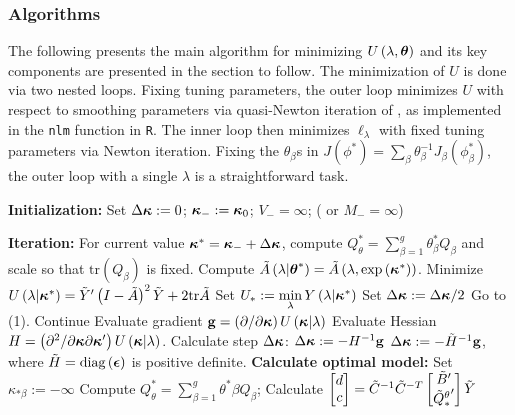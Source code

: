 \subsubsection{Algorithms}

The following presents the main algorithm for minimizing $U\left(\lambda, \mbox{\boldmath $\theta$} \right)$ and its key components are presented in the section to follow. The minimization of $U$ is done via two nested loops. Fixing tuning parameters, the outer loop minimizes $U$ with respect to smoothing parameters via quasi-Newton iteration of \cite{dennis1996numerical}, as implemented in the \texttt{nlm} function in \texttt{R}. The inner loop then minimizes $\ell_\lambda$ with fixed tuning parameters via Newton iteration. Fixing the $\theta_\beta$s in $J \left(\phi^*\right) = \sum_\beta \theta^{-1}_\beta J_\beta \left(\phi_\beta^*\right)$, the outer loop with a single $\lambda$ is a straightforward task. 

\begin{algorithm}[H]
\caption{ }
\begin{algorithmic}
\STATE \textbf{Initialization:} 
	\STATE Set $\Delta \mbox{\boldmath $\kappa$} := 0$; \;$\mbox{\boldmath $\kappa$}_{-}:=\mbox{\boldmath $\kappa$}_{0}$; \;$V_- = \infty$; \;( or $M_- = \infty$)

\STATE \textbf{Iteration:} 
		\STATE For current value $\mbox{\boldmath $\kappa$}^* = \mbox{\boldmath $\kappa$}_- + \Delta \mbox{\boldmath $\kappa$}$, compute $Q^*_\theta = \sum_{\beta = 1}^g \theta^*_\beta Q_\beta$ and scale so that $\mbox{tr}\left(Q_\beta\right)$ is fixed. 
		\STATE Compute $\tilde{A}\left(\lambda \vert \mbox{\boldmath $\theta$}^* \right) = \tilde{A}\left(\lambda, \exp\left({\mbox{\boldmath $\kappa$}^*} \right)\right)$.
		\STATE Minimize $U\left(\lambda \vert \mbox{\boldmath $\kappa$}^* \right) =  \tilde{Y}'\left( I - \tilde{A} \right)^2\tilde{Y} + 2\mbox{tr}\tilde{A} $
		\STATE Set $U_* := \min \limits_\lambda Y\left( \lambda \vert \mbox{\boldmath $\kappa$}^* \right) $
		 		\STATE Set $\Delta \mbox{\boldmath $\kappa$} := \Delta \mbox{\boldmath $\kappa$}/2$
		 		\STATE Go to (1).
		\ELSE
		\STATE Continue
		\ENDIF
		\STATE Evaluate gradient $\mathbf{g} = \left(\partial /\partial \mbox{\boldmath $\kappa$}\right) U\left(\mbox{\boldmath $\kappa$} \vert \lambda\right)$
		\STATE Evaluate Hessian $H = \left(\partial^2 /\partial \mbox{\boldmath $\kappa$}\partial \mbox{\boldmath $\kappa$}' \right) U\left(\mbox{\boldmath $\kappa$} \vert \lambda\right)$.
		\STATE Calculate step $\Delta \mbox{\boldmath $\kappa$}$:
				\STATE $\Delta \mbox{\boldmath $\kappa$} := -H^{-1} \mathbf{g}$
			\ELSE
				\STATE $\Delta \mbox{\boldmath $\kappa$} := -\tilde{H}^{-1} \mathbf{g}$, where $\tilde{H} = \textup{diag}\left(\mbox{\boldmath $\epsilon$}\right)$ is positive definite. \label{ensure-hessian-PD}
			\ENDIF
	\ENDWHILE
\STATE \textbf{Calculate optimal model:} 
		\STATE Set $\kappa_{*\beta} := -\infty$
	\ENDIF
	\STATE Compute $Q^*_\theta = \sum_{\beta = 1}^g \theta^*{\beta} Q_\beta$;
	\STATE Calculate $\begin{bmatrix} d \\ c \end{bmatrix} = \tilde{C}^{-1} \tilde{C}^{-T} \begin{bmatrix} \tilde{B}' \\ {\tilde{Q}_*^\theta}' \end{bmatrix} \tilde{Y}$
\end{algorithmic}
\end{algorithm}

